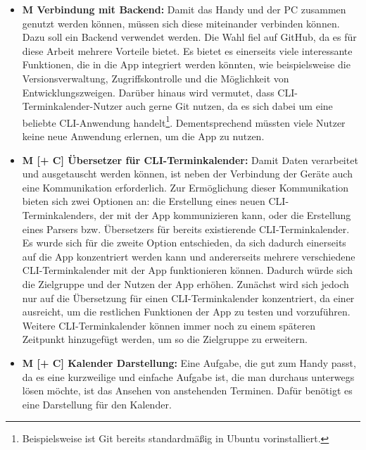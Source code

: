 \begin{itemize}
	\item \textbf{M Verbindung mit Backend:} %
		Damit das Handy und der PC zusammen genutzt werden können, müssen sich diese miteinander verbinden können. Dazu soll ein Backend verwendet werden. Die Wahl fiel auf GitHub, da es für diese Arbeit mehrere Vorteile bietet. %
			Es bietet es einerseits viele interessante Funktionen, die in die App integriert werden könnten, wie beispielsweise die Versionsverwaltung, Zugriffskontrolle und die Möglichkeit von Entwicklungszweigen. %
			Darüber hinaus wird vermutet, dass CLI-Terminkalender-Nutzer auch gerne Git nutzen, da es sich dabei um eine beliebte CLI-Anwendung handelt\footnote{Beispielsweise ist Git bereits standardmäßig in Ubuntu vorinstalliert.\cite{nfA_ubuntuManifestGIT}}. Dementsprechend müssten viele Nutzer keine neue Anwendung erlernen, um die App zu nutzen.%
	\item \textbf{M [+ C] Übersetzer für CLI-Terminkalender:} %
		Damit Daten verarbeitet und ausgetauscht werden können, ist neben der Verbindung der Geräte auch eine Kommunikation erforderlich. %
			Zur Ermöglichung dieser Kommunikation bieten sich zwei Optionen an: die Erstellung eines neuen CLI-Terminkalenders, der mit der App kommunizieren kann, oder die Erstellung eines Parsers bzw. Übersetzers für bereits existierende CLI-Terminkalender.
				Es wurde sich für die zweite Option entschieden, da sich dadurch einerseits auf die App konzentriert werden kann und andererseits mehrere verschiedene CLI-Terminkalender mit der App funktionieren können. Dadurch würde sich die Zielgruppe und der Nutzen der App erhöhen.\newline%
		Zunächst wird sich jedoch nur auf die Übersetzung für einen CLI-Terminkalender konzentriert, da einer ausreicht, um die restlichen Funktionen der App zu testen und vorzuführen.%
		Weitere CLI-Terminkalender können immer noch zu einem späteren Zeitpunkt hinzugefügt werden, um so die Zielgruppe zu erweitern.%
	\item \textbf{M [+ C] Kalender Darstellung:} %
		Eine Aufgabe, die gut zum Handy passt, da es eine kurzweilige und einfache Aufgabe ist, die man durchaus unterwegs lösen möchte, ist das Ansehen von anstehenden Terminen. Dafür benötigt es eine Darstellung für den Kalender. %

\end{itemize}
